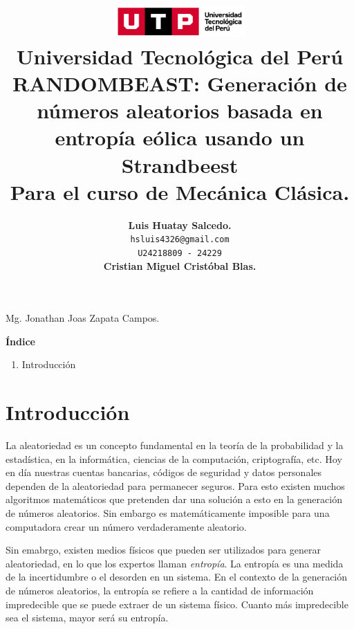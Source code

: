 \documentclass{article}
\title{
  \includegraphics[width=5cm]{./assets/logo-utp.png} \\
  \vspace{1cm}
  \textbf{Universidad Tecnológica del Perú} \\
  \vspace{2cm}
  \textbf{RANDOMBEAST: Generación de números aleatorios basada en entropía eólica usando un Strandbeest} \\
  \vspace{1cm}
  \large \textbf{Para el curso de Mecánica Clásica.}
}
\author{
  \textbf{Luis Huatay Salcedo.} \\
  \texttt{hsluis4326@gmail.com} \\
  \texttt{U24218809 - 24229} \\
  \textbf{Cristian Miguel Cristóbal Blas.} \\
}
\begin{document}
\maketitle
\thispagestyle{empty}
\begin{center}
  Mg. Jonathan Joas Zapata Campos.  
\end{center}
\restoregeometry

\newpage

\begin{center}
  \textbf{\Large Índice}
\end{center}
\vspace{0.5cm} %

\begin{spacing}{1.15} %
  \noindent
  \begin{enumerate}
    \item Introducción
    \end{enumerate}
\end{spacing}

\newpage
\vspace*{\fill}
\section{Introducción}
La aleatoriedad es un concepto fundamental en la teoría de la probabilidad y la estadística, en la informática, ciencias de la computación, criptografía, etc. Hoy en día nuestras cuentas bancarias, códigos de seguridad y datos personales dependen de la aleatoriedad para permanecer seguros. Para esto existen muchos algoritmos matemáticos que pretenden dar una solución a esto en la generación de números aleatorios. Sin embargo es matemáticamente imposible para una computadora crear un número verdaderamente aleatorio.

Sin emabrgo, existen medios físicos que pueden ser utilizados para generar aleatoriedad, en lo que los expertos llaman \textit{entropía}. La entropía es una medida de la incertidumbre o el desorden en un sistema. En el contexto de la generación de números aleatorios, la entropía se refiere a la cantidad de información impredecible que se puede extraer de un sistema físico. Cuanto más impredecible sea el sistema, mayor será su entropía.
\end{document}
